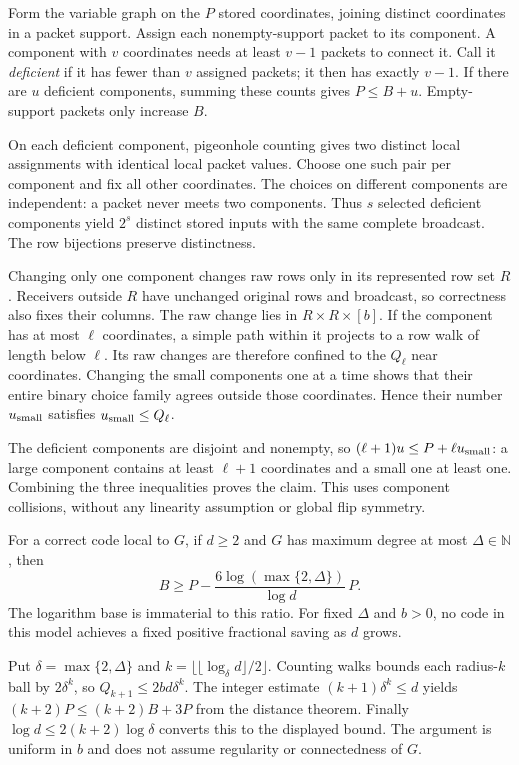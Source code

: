 \begin{proofoutline}
Form the variable graph on the $P$ stored coordinates, joining distinct
coordinates in a packet support. Assign each nonempty-support packet to its
component. A component with $v$ coordinates needs at least $v-1$ packets to
connect it. Call it \emph{deficient} if it has fewer than $v$ assigned
packets; it then has exactly $v-1$. If there are $u$ deficient components,
summing these counts gives $P\le B+u$. Empty-support packets only increase $B$.

On each deficient component, pigeonhole counting gives two distinct local
assignments with identical local packet values. Choose one such pair per
component and fix all other coordinates. The choices on different components
are independent: a packet never meets two components. Thus $s$ selected
deficient components yield $2^s$ distinct stored inputs with the same complete
broadcast. The row bijections preserve distinctness.

Changing only one component changes raw rows only in its represented row set
$R$. Receivers outside $R$ have unchanged original rows and broadcast, so
correctness also fixes their columns. The raw change lies in
$R\times R\times[b]$. If the component has at most $\ell$ coordinates,
a simple path within it projects to a row walk of length below $\ell$.
Its raw changes are therefore confined to the $Q_\ell$ near coordinates.
Changing the small components one at a time shows that their entire binary
choice family agrees outside those coordinates. Hence their number
$u_{\rm small}$ satisfies $u_{\rm small}\le Q_\ell$.

The deficient components are disjoint and nonempty, so
$(\ell+1)u\le P+\ell u_{\rm small}$: a large component contains at least
$\ell+1$ coordinates and a small one at least one. Combining the three
inequalities proves the claim. This uses component collisions, without any
linearity assumption or global flip symmetry.
\end{proofoutline}

\begin{corollary}\label{cor:local-xor-degree}
For a correct code local to $G$, if $d\ge2$ and $G$ has maximum degree at
most $\Delta\in\mathbb N$, then
\[
 B\ge P-\frac{6\log(\max\{2,\Delta\})}{\log d}\,P.
\]
The logarithm base is immaterial to this ratio.  For fixed $\Delta$ and
$b>0$, no code in this model achieves a fixed positive fractional saving as
$d$ grows.
\end{corollary}
\begin{proofoutline}
Put $\delta=\max\{2,\Delta\}$ and
$k=\lfloor\lfloor\log_\delta d\rfloor/2\rfloor$.  Counting walks bounds each
radius-$k$ ball by $2\delta^k$, so $Q_{k+1}\le2bd\delta^k$.
The integer estimate $(k+1)\delta^k\le d$ yields
$(k+2)P\le(k+2)B+3P$ from the distance theorem.
Finally $\log d\le2(k+2)\log\delta$ converts this to the displayed bound.
The argument is uniform in $b$ and does not assume regularity or
connectedness of $G$.
\end{proofoutline}

